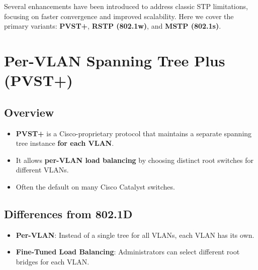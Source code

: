 \documentclass[a4paper]{report}
\begin{document}
Several enhancements have been introduced to address classic STP limitations, focusing on faster convergence and improved scalability. Here we cover the primary variants: \textbf{PVST+}, \textbf{RSTP (802.1w)}, and \textbf{MSTP (802.1s)}.

\section{Per-VLAN Spanning Tree Plus (PVST+)}

\subsection{Overview}
\begin{itemize}
    \item \textbf{PVST+} is a Cisco-proprietary protocol that maintains a separate spanning tree instance \textbf{for each VLAN}.
    \item It allows \textbf{per-VLAN load balancing} by choosing distinct root switches for different VLANs.
    \item Often the default on many Cisco Catalyst switches.
\end{itemize}

\subsection{Differences from 802.1D}
\begin{itemize}
    \item \textbf{Per-VLAN}: Instead of a single tree for all VLANs, each VLAN has its own.
    \item \textbf{Fine-Tuned Load Balancing}: Administrators can select different root bridges for each VLAN.
\end{itemize}
\end{document}
